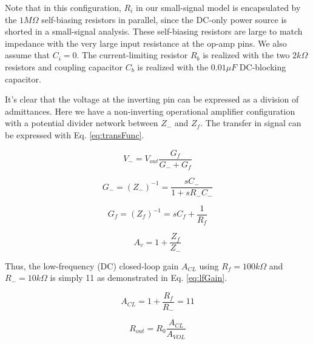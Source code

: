 \documentclass[journal]{IEEEtran}
\begin{document}
Note that in this configuration, $R_i$ in our small-signal model is encapsulated by the $1 M\Omega$ self-biasing resistors in parallel, since the DC-only power source is shorted in a small-signal analysis. These self-biasing resistors are large to match impedance with the very large input resistance at the op-amp pins. We also assume that $C_i = 0$. The current-limiting resistor $R_b$ is realized with the two $2 k\Omega$ resistors and coupling capacitor $C_b$ is realized with the $0.01 \mu F$ DC-blocking capacitor. 

It's clear that the voltage at the inverting pin can be expressed as a division of admittances. Here we have a non-inverting operational amplifier configuration with a potential divider network between $Z_{-}$ and $Z_{f}$. The transfer in signal can be expressed with Eq. \ref{eq:transFunc}.

\begin{figure}[ht]

	\begin{equation}
		V_{-} = V_{out} \frac{G_{f}}{G_{-} + G_{f}}
		\label{eq:invertingPin}
	\end{equation}
	
	\begin{equation}
		G_{-} = (Z_{-})^{-1} = \frac{sC_{-}}{1 + sR_{-}C_{-}} 
		\label{eq:Gminus}
	\end{equation}

	\begin{equation}
		G_{f} = (Z_{f})^{-1} = sC_{f} + \frac{1}{R_{f}}
		\label{eq:Gf}
	\end{equation}
	
	\begin{equation}
		A_{v} = 1 + \frac{Z_{f}}{Z_{-}}
		\label{eq:transFunc}
	\end{equation}
\end{figure}

Thus, the low-frequency (DC) closed-loop gain $A_{CL}$ using $R_{f} = 100 k\Omega$ and $R_{-} = 10 k\Omega$ is simply 11 as demonstrated in Eq. \ref{eq:lfGain}.

\begin{figure}[ht]
	\begin{equation}
		A_{CL} = 1 + \frac{R_{f}}{R_{-}} = 11
		\label{eq:lfGain}
	\end{equation}
	
	\begin{equation}
		R_{out} = R_{0} \frac{A_{CL}}{A_{VOL}}
		\label{eq:outZ}
	\end{equation}
\end{figure}
\end{document}
